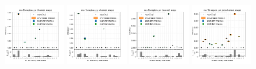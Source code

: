 \begin{figure}
    \centering
    \includegraphics[width=0.24\textwidth]{chapters/Appendix/sectionTTSyst/figures/afterCorr/icata0_ch0_meps.png}
    \includegraphics[width=0.24\textwidth]{chapters/Appendix/sectionTTSyst/figures/afterCorr/icata0_ch1_meps.png}
    \includegraphics[width=0.24\textwidth]{chapters/Appendix/sectionTTSyst/figures/afterCorr/icata0_ch2_meps.png}
    \includegraphics[width=0.24\textwidth]{chapters/Appendix/sectionTTSyst/figures/afterCorr/icata0_ch3_meps.png}


\end{figure}
